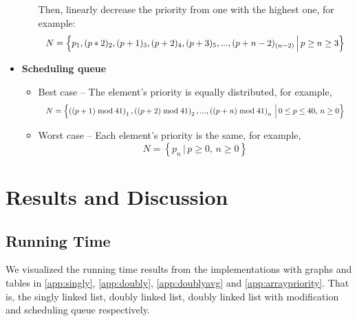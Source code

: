 \documentclass[a4paper,11pt]{kth-mag}
\begin{document}
\begin{itemize}
\begin{itemize}
                Then, linearly decrease the priority from one with the highest one, for example:
                \begin{equation*}
                    \resizebox{.9\hsize}{!}{$N = \left\{p_1, (p*2)_2, (p+1)_3, (p+2)_4, (p+3)_5,..., (p+n-2)_{(n-2)} \, \Big| \, p \ge n \ge 3 \right\}$}
                \end{equation*}
        \end{itemize}
    \item \textbf{Scheduling queue}
        \begin{itemize}
            \item Best case -- The element's priority is equally distributed, for example,
                \begin{equation*}
                    \resizebox{.9\hsize}{!}{$N = \left\{\left((p+1) \bmod 41\right)_1, \left((p+2) \bmod 41\right)_2,..., \left((p+n) \bmod 41\right)_n \, \Big| \, 0 \le p \le 40, \, n \ge 0\right\}$}
                \end{equation*}
            \item Worst case -- Each element's priority is the same, for example,
                \begin{equation*}
                    N = \left\{p_{n} \, \Big| \, p \ge 0,\, n \ge 0 \right\}
                \end{equation*}
        \end{itemize}
\end{itemize}


\chapter{Results and Discussion}

\section{Running Time}
We visualized the running time results from the implementations with graphs and tables in \cref{app:singly}, \cref{app:doubly}, \cref{app:doublyavg} and \cref{app:arraypriority}.
That is, the singly linked list, doubly linked list, doubly linked list with modification and scheduling queue respectively.
\end{document}
